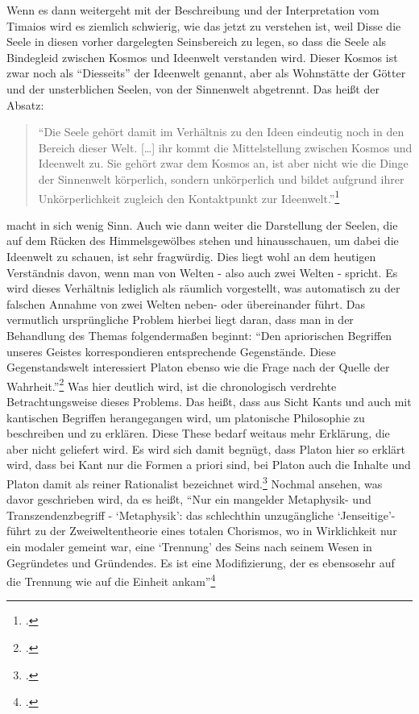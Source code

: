 \documentclass[12pt]{article}
\newcommand*{\zitatblock}[1]{%
    \begin{quote}
    \fontsize{10}{12}\selectfont
    \setlength{\parskip}{1.0em}
    #1
    \end{quote}
}
\begin{document}
Wenn es dann weitergeht mit der Beschreibung und der Interpretation vom Timaios wird es ziemlich schwierig, wie das jetzt zu verstehen ist, weil Disse die Seele in diesen vorher dargelegten Seinsbereich zu legen, so dass die Seele als Bindegleid zwischen Kosmos und Ideenwelt verstanden wird. Dieser Kosmos ist zwar noch als \enquote{Diesseits} der Ideenwelt genannt, aber als Wohnstätte der Götter und der unsterblichen Seelen, von der Sinnenwelt abgetrennt. Das heißt der Absatz: \zitatblock{\enquote{Die Seele gehört damit im Verhältnis zu den Ideen eindeutig noch in den Bereich dieser Welt. [\dots] ihr kommt die Mittelstellung zwischen Kosmos und Ideenwelt zu. Sie gehört zwar dem Kosmos an, ist aber nicht wie die Dinge der Sinnenwelt körperlich, sondern unkörperlich und bildet aufgrund ihrer Unkörperlichkeit zugleich den Kontaktpunkt zur Ideenwelt.}\footcite[vgl.][S. 58]{DisseMetaphysik}} macht in sich wenig Sinn. Auch wie dann weiter die Darstellung der Seelen, die auf dem Rücken des Himmelsgewölbes stehen und hinausschauen, um dabei die Ideenwelt zu schauen, ist sehr fragwürdig. 
Dies liegt wohl an dem heutigen Verständnis davon, wenn man von Welten - also auch zwei Welten - spricht. Es wird dieses Verhältnis lediglich als räumlich vorgestellt, was automatisch zu der falschen Annahme von zwei Welten neben- oder übereinander führt.
Das vermutlich ursprüngliche Problem hierbei liegt daran, dass man in der Behandlung des Themas folgendermaßen beginnt: \enquote{Den apriorischen Begriffen unseres Geistes korrespondieren entsprechende Gegenstände. Diese Gegenstandswelt interessiert Platon ebenso wie die Frage nach der Quelle der Wahrheit.}\footcite[][S. 97]{Hirschberger}
Was hier deutlich wird, ist die chronologisch verdrehte Betrachtungsweise dieses Problems. Das heißt, dass aus Sicht Kants und auch mit kantischen Begriffen herangegangen wird, um platonische Philosophie zu beschreiben und zu erklären. Diese These bedarf weitaus mehr Erklärung, die aber nicht geliefert wird. Es wird sich damit begnügt, dass Platon hier so erklärt wird, dass bei Kant nur die Formen a priori sind, bei Platon auch die Inhalte und Platon damit als reiner Rationalist bezeichnet wird.\footcite[vgl.][S.96]{Hirschberger} 
Nochmal ansehen, was davor geschrieben wird, da es heißt, \enquote{Nur ein mangelder Metaphysik- und Transzendenzbegriff - \enquote{Metaphysik}: das schlechthin unzugängliche \enquote{Jenseitige}- führt zu der Zweiweltentheorie eines totalen Chorismos, wo in Wirklichkeit nur ein modaler gemeint war, eine \enquote{Trennung} des Seins nach seinem Wesen in Gegründetes und Gründendes. Es ist eine Modifizierung, der es ebensosehr auf die Trennung wie auf die Einheit ankam}\footcite[][S. 96]{Hirschberger}
\end{document}
